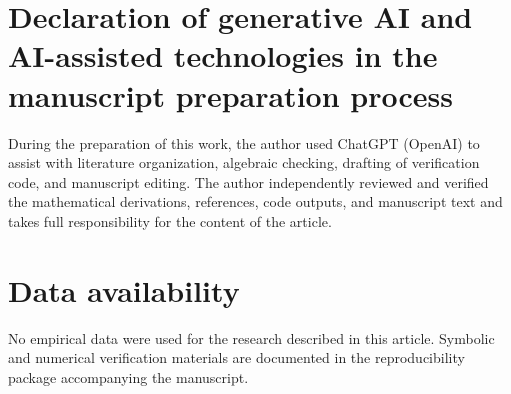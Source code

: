 \section*{Declaration of generative AI and AI-assisted technologies in the manuscript preparation process}

During the preparation of this work, the author used ChatGPT (OpenAI) to assist with literature organization, algebraic checking, drafting of verification code, and manuscript editing. The author independently reviewed and verified the mathematical derivations, references, code outputs, and manuscript text and takes full responsibility for the content of the article.

\section*{Data availability}

No empirical data were used for the research described in this article. Symbolic and numerical verification materials are documented in the reproducibility package accompanying the manuscript.
